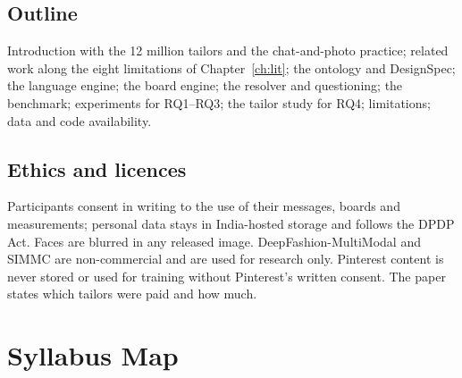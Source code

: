 \section{Outline}

Introduction with the 12 million tailors and the chat-and-photo practice; related work along the eight limitations of Chapter~\ref{ch:lit}; the ontology and DesignSpec; the language engine; the board engine; the resolver and questioning; the benchmark; experiments for RQ1--RQ3; the tailor study for RQ4; limitations; data and code availability.

\section{Ethics and licences}

Participants consent in writing to the use of their messages, boards and measurements; personal data stays in India-hosted storage and follows the DPDP Act. Faces are blurred in any released image. DeepFashion-MultiModal and SIMMC are non-commercial and are used for research only. Pinterest content is never stored or used for training without Pinterest's written consent. The paper states which tailors were paid and how much.

\chapter{Syllabus Map}\label{ch:syllabus}

